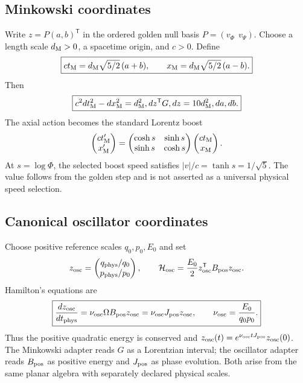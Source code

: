 \documentclass[10pt]{article}
\begin{document}
\subsection*{Minkowski coordinates}
Write $z=P(a,b)^{\mathsf T}$ in the ordered golden null basis
$P=(v_\Phi\ \ v_\Psi)$. Choose a length scale $d_{\rm M}>0$, a spacetime origin, and $c>0$. Define
\begin{equation}
\boxed{ct_{\rm M}=d_{\rm M}\sqrt{5/2}\,(a+b),\qquad
x_{\rm M}=d_{\rm M}\sqrt{5/2}\,(a-b).}
\end{equation}
Then
\begin{equation}
\boxed{c^2dt_{\rm M}^2-dx_{\rm M}^2
=d_{\rm M}^2,dz^{\mathsf T}G,dz
=10d_{\rm M}^2,da,db.}
\end{equation}
The axial action becomes the standard Lorentz boost
\begin{equation}
\begin{pmatrix}ct_{\rm M}'\\x_{\rm M}'\end{pmatrix}
=\begin{pmatrix}\cosh s&\sinh s\\\sinh s&\cosh s\end{pmatrix}
\begin{pmatrix}ct_{\rm M}\\x_{\rm M}\end{pmatrix}.
\end{equation}
At $s=\log\Phi$, the selected boost speed satisfies $|v|/c=\tanh s=1/\sqrt5$. The value follows from the golden step and is not asserted as a universal physical speed selection.

\subsection*{Canonical oscillator coordinates}
Choose positive reference scales $q_0,p_0,E_0$ and set
\begin{equation}
z_{\rm osc}=\begin{pmatrix}q_{\rm phys}/q_0\\p_{\rm phys}/p_0\end{pmatrix},\qquad
\mathcal H_{\rm osc}=\frac{E_0}{2}z_{\rm osc}^{\mathsf T}B_{\rm pos}z_{\rm osc}.
\end{equation}
Hamilton's equations are
\begin{equation}
\boxed{\frac{dz_{\rm osc}}{dt_{\rm phys}}
=\nu_{\rm osc}\Omega B_{\rm pos}z_{\rm osc}
=\nu_{\rm osc}J_{\rm pos}z_{\rm osc},\qquad
\nu_{\rm osc}=\frac{E_0}{q_0p_0}.}
\end{equation}
Thus the positive quadratic energy is conserved and
$z_{\rm osc}(t)=e^{\nu_{\rm osc}tJ_{\rm pos}}z_{\rm osc}(0)$.
The Minkowski adapter reads $G$ as a Lorentzian interval; the oscillator adapter reads $B_{\rm pos}$ as positive energy and $J_{\rm pos}$ as phase evolution. Both arise from the same planar algebra with separately declared physical scales.
\end{document}

